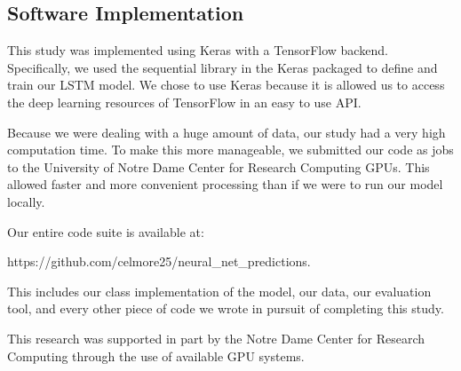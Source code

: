 \documentclass[sigconf]{acmart}
\begin{document}
\subsection{Software Implementation}
This study was implemented using Keras with a TensorFlow backend. Specifically, we used the sequential library in the Keras packaged to define and train our LSTM model. We chose to use Keras because it is allowed us to access the deep learning resources of TensorFlow in an easy to use API. 

Because we were dealing with a huge amount of data, our study had a very high computation time. To make this more manageable, we submitted our code as jobs to the University of Notre Dame Center for Research Computing GPUs. This allowed faster and more convenient processing than if we were to run our model locally. 

Our entire code suite  is available at:

https://github.com/celmore25/neural_net_predictions.

This includes our class implementation of the model, our data, our evaluation tool, and every other piece of code we wrote in pursuit of completing this study. 

This research was supported in part by the Notre Dame Center for Research Computing through the use of available GPU systems. 
\end{document}
